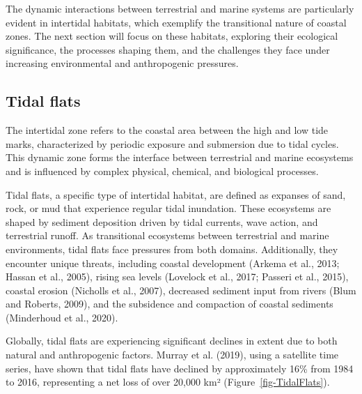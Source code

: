 \documentclass[
  letterpaper,
  11pt,
  english,
  singlespacing,
  headsepline]{MastersDoctoralThesis}
\begin{document}
\begin{spacing}{1.5}
\begin{tcolorbox}
The dynamic interactions between terrestrial and marine systems are particularly evident in intertidal habitats, which exemplify the transitional nature of coastal zones. The next section will focus on these habitats, exploring their ecological significance, the processes shaping them, and the challenges they face under increasing environmental and anthropogenic pressures.
\end{tcolorbox}

\subsection{Tidal flats}\label{tidal-flats}

The intertidal zone refers to the coastal area between the high and low
tide marks, characterized by periodic exposure and submersion due to
tidal cycles. This dynamic zone forms the interface between terrestrial
and marine ecosystems and is influenced by complex physical, chemical,
and biological processes.

Tidal flats, a specific type of intertidal habitat, are defined as
expanses of sand, rock, or mud that experience regular tidal inundation.
These ecosystems are shaped by sediment deposition driven by tidal
currents, wave action, and terrestrial runoff. As transitional
ecosystems between terrestrial and marine environments, tidal flats face
pressures from both domains. Additionally, they encounter unique
threats, including coastal development (Arkema et al., 2013; Hassan et
al., 2005), rising sea levels (Lovelock et al., 2017; Passeri et al.,
2015), coastal erosion (Nicholls et al., 2007), decreased sediment input
from rivers (Blum and Roberts, 2009), and the subsidence and compaction
of coastal sediments (Minderhoud et al., 2020).

Globally, tidal flats are experiencing significant declines in extent
due to both natural and anthropogenic factors. Murray et al. (2019),
using a satellite time series, have shown that tidal flats have declined
by approximately 16\% from 1984 to 2016, representing a net loss of over
20,000 km² (Figure~\ref{fig-TidalFlats}).

\begin{figure}

\centering{

}
\end{figure}
\end{spacing}
\end{document}
